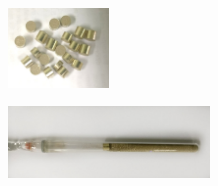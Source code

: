 \documentclass[usenames,dvipsnames]{beamer}
\begin{document}
\begin{frame}
\begin{multicols}{2}
\includegraphics[width=0.2\textwidth]{img/proceso/PastMolienda.jpg}

\includegraphics[width=0.4\textwidth]{img/proceso/ClavoPolvo.jpg}

\end{multicols}
 
 \end{frame}
\end{document}
